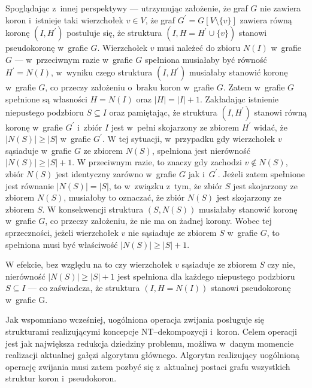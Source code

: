 {\begin{bproof}
    Spoglądając z~innej perspektywy --- utrzymując założenie, że graf $G$ nie zawiera koron i~istnieje taki wierzchołek $v \in V$, że graf $G^\prime= G[V \setminus \{v\}]$ zawiera równą koronę $(I, H^\prime)$ postuluje się, że struktura $(I, H=H^\prime \cup \{v\})$ stanowi pseudokoronę w~grafie $G$.
    Wierzchołek $v$ musi należeć do zbioru $N(I)$ w~grafie $G$ --- w~przeciwnym razie w~grafie $G$ spełniona musiałaby być równość $H^\prime=N(I)$, w~wyniku czego struktura $(I, H^\prime)$ musiałaby stanowić koronę w~grafie $G$, co przeczy założeniu o~braku koron w~grafie $G$.
    Zatem w~grafie $G$ spełnione są własności $H=N(I)$ oraz $|H|=|I|+1$.
    Zakładając istnienie niepustego podzbioru $S \subseteq I$ oraz pamiętając, że struktura $(I, H^\prime)$ stanowi równą koronę w~grafie $G^\prime$ i~zbiór $I$ jest w~pełni skojarzony ze zbiorem $H^\prime$ widać, że $|N(S)| \geq |S|$ w~grafie $G^\prime$.
    W tej sytuacji, w~przypadku gdy wierzchołek $v$ sąsiaduje w~grafie $G$ ze zbiorem $N(S)$, spełniona jest nierówność $|N(S)| \geq |S| + 1$.
    W przeciwnym razie, to znaczy gdy zachodzi $v \notin N(S)$, zbiór $N(S)$ jest identyczny zarówno w~grafie $G$ jak i~$G^\prime$.
    Jeżeli zatem spełnione jest równanie $|N(S)|=|S|$, to w~związku z~tym, że zbiór $S$ jest skojarzony ze zbiorem $N(S)$, musiałoby to oznaczać, że zbiór $N(S)$ jest skojarzony ze zbiorem $S$.
    W konsekwencji struktura $(S, N(S))$ musiałaby stanowić koronę w~grafie $G$, co przeczy założeniu, że nie ma on żadnej korony.
    Wobec tej sprzeczności, jeżeli wierzchołek $v$ nie sąsiaduje ze zbiorem $S$ w~grafie $G$, to spełniona musi być właściwość $|N(S)| \geq |S| + 1$.

    W efekcie, bez względu na to czy wierzchołek $v$ sąsiaduje ze zbiorem $S$ czy nie, nierówność $|N(S)| \geq |S| + 1$ jest spełniona dla każdego niepustego podzbioru $S \subseteq I$ --- co zaświadcza, że struktura $(I, H=N(I))$ stanowi pseudokoronę w~grafie G.
  \end{bproof}

  Jak wspomniano wcześniej, uogólniona operacja zwijania posługuje się strukturami realizującymi koncepcje NT--dekompozycji i~koron.
  Celem operacji jest jak największa redukcja dziedziny problemu, możliwa w~danym momencie realizacji aktualnej gałęzi algorytmu głównego.
  Algorytm realizujący uogólnioną operację zwijania musi zatem pozbyć się z~aktualnej postaci grafu wszystkich struktur koron i~pseudokoron.

}
